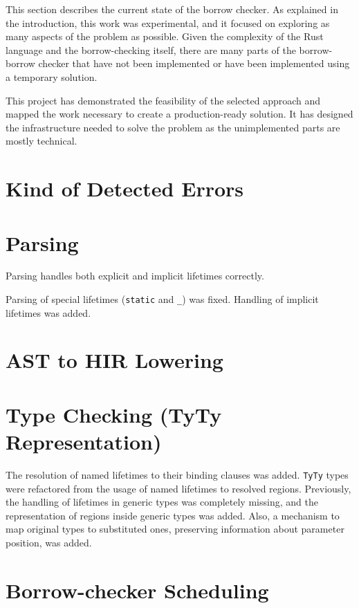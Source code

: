 \documentclass[
  11pt,
]{report}
\begin{document}
This section describes the current state of the borrow checker. As
explained in the introduction, this work was experimental, and it
focused on exploring as many aspects of the problem as possible. Given
the complexity of the Rust language and the borrow-checking itself,
there are many parts of the borrow-borrow checker that have not been
implemented or have been implemented using a temporary solution.

This project has demonstrated the feasibility of the selected approach
and mapped the work necessary to create a production-ready solution. It
has designed the infrastructure needed to solve the problem as the
unimplemented parts are mostly technical.

\section{Kind of Detected Errors}\label{kind-of-detected-errors}

\section{Parsing}\label{parsing}

Parsing handles both explicit and implicit lifetimes correctly.

Parsing of special lifetimes (\texttt{\textquotesingle{}static} and
\texttt{\textquotesingle{}\_}) was fixed. Handling of implicit lifetimes
was added.

\section{AST to HIR Lowering}\label{ast-to-hir-lowering}

\section{Type Checking (TyTy
Representation)}\label{type-checking-tyty-representation}

The resolution of named lifetimes to their binding clauses was added.
\texttt{TyTy} types were refactored from the usage of named lifetimes to
resolved regions. Previously, the handling of lifetimes in generic types
was completely missing, and the representation of regions inside generic
types was added. Also, a mechanism to map original types to substituted
ones, preserving information about parameter position, was added.

\section{Borrow-checker Scheduling}\label{borrow-checker-scheduling}
\end{document}
